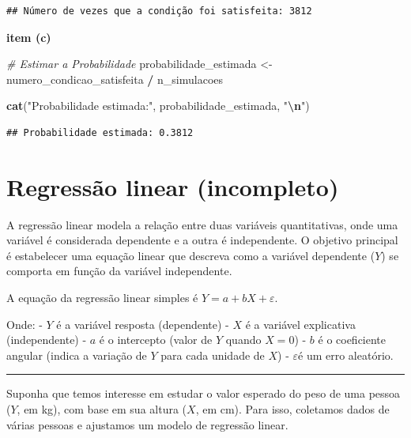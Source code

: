\documentclass[
]{book}
\newenvironment{Shaded}{\begin{snugshade}}{\end{snugshade}}
\newcommand{\CommentTok}[1]{\textcolor[rgb]{0.56,0.35,0.01}{\textit{#1}}}
\newcommand{\FunctionTok}[1]{\textcolor[rgb]{0.13,0.29,0.53}{\textbf{#1}}}
\newcommand{\NormalTok}[1]{#1}
\newcommand{\OtherTok}[1]{\textcolor[rgb]{0.56,0.35,0.01}{#1}}
\newcommand{\SpecialCharTok}[1]{\textcolor[rgb]{0.81,0.36,0.00}{\textbf{#1}}}
\newcommand{\StringTok}[1]{\textcolor[rgb]{0.31,0.60,0.02}{#1}}
\begin{document}
\begin{verbatim}
## Número de vezes que a condição foi satisfeita: 3812
\end{verbatim}

\textbf{item (c)}

\begin{Shaded}
\begin{Highlighting}[]
\CommentTok{\# Estimar a Probabilidade}
\NormalTok{probabilidade\_estimada }\OtherTok{\textless{}{-}}\NormalTok{ numero\_condicao\_satisfeita }\SpecialCharTok{/}\NormalTok{ n\_simulacoes}

\FunctionTok{cat}\NormalTok{(}\StringTok{"Probabilidade estimada:"}\NormalTok{, probabilidade\_estimada, }\StringTok{"}\SpecialCharTok{\textbackslash{}n}\StringTok{"}\NormalTok{)}
\end{Highlighting}
\end{Shaded}

\begin{verbatim}
## Probabilidade estimada: 0.3812
\end{verbatim}

\chapter{Regressão linear (incompleto)}\label{regressuxe3o-linear-incompleto}

A regressão linear modela a relação entre duas variáveis quantitativas, onde uma variável é considerada dependente e a outra é independente. O objetivo principal é estabelecer uma equação linear que descreva como a variável dependente (\(Y\)) se comporta em função da variável independente.

A equação da regressão linear simples é \(Y = a + b X + \varepsilon\).

Onde:
- \(Y\) é a variável resposta (dependente)
- \(X\) é a variável explicativa (independente)
- \(a\) é o intercepto (valor de \(Y\) quando \(X = 0\))
- \(b\) é o coeficiente angular (indica a variação de \(Y\) para cada unidade de \(X\))
- \(\varepsilon\)é um erro aleatório.

\begin{center}\rule{0.5\linewidth}{0.5pt}\end{center}

Suponha que temos interesse em estudar o valor esperado do peso de uma pessoa (\(Y\), em kg), com base em sua altura (\(X\), em cm). Para isso, coletamos dados de várias pessoas e ajustamos um modelo de regressão linear.
\end{document}
